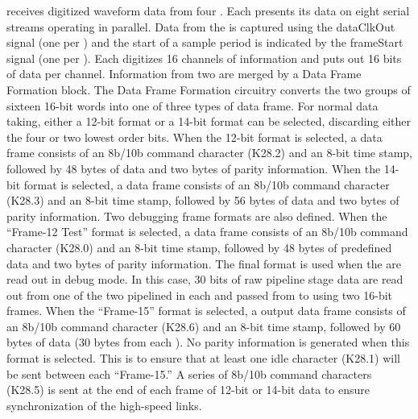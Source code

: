 receives digitized waveform data from 
four  . Each  presents its data on eight 
serial streams operating in parallel. Data from the  is captured 
using the  dataClkOut signal  
(one per ) and the start of a 
sample period is indicated by the frameStart signal (one per ). 
Each  digitizes \num{16} channels of information and puts out \num{16} bits 
of data per channel. Information from two  are merged by a Data 
Frame Formation block.  
The Data Frame Formation circuitry converts the two 
groups of sixteen \num{16}-bit words into one of three types of data frame. For normal 
data taking, either a \num{12}-bit format or a \num{14}-bit  format can be 
selected, discarding either the four or two lowest order bits. When the 
\num{12}-bit format is selected, a data frame consists of an 8b/10b command 
character (K28.2) and an \num{8}-bit time stamp, followed by \num{48} bytes of  
data and two bytes of parity information. When the \num{14}-bit format is selected, 
a data frame consists of an 8b/10b command character (K28.3) and an \num{8}-bit time 
stamp, followed by \num{56} bytes of  data and two bytes of parity 
information. Two debugging frame formats are also defined. When the ``Frame-12 Test'' 
format is selected, a data frame consists of an 8b/10b command character 
(K28.0) and an \num{8}-bit time stamp, followed by \num{48} bytes of predefined data 
and two bytes of parity information. The final format is used when the 
 are read out in debug mode. In this case, \num{30} bits of raw 
pipeline stage data are read out from one of the two pipelined  
in each   and passed from  to 
 using two \num{16}-bit frames. When the ``Frame-15'' format is 
selected, a  output data frame consists of an 8b/10b command 
character (K28.6) and an \num{8}-bit time stamp, followed by \num{60} bytes of  
data (\num{30} bytes from each ). No parity information is generated 
when this format is selected. This is to ensure that at least one idle 
character (K28.1) will be sent between each ``Frame-15.'' A series of 8b/10b 
command characters (K28.5) is sent at the end of each frame of \num{12}-bit or 
\num{14}-bit data to ensure synchronization of the high-speed links.

